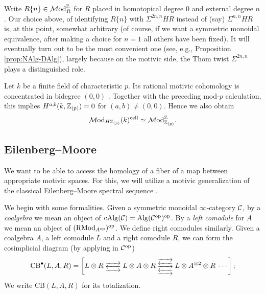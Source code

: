 \documentclass{amsart}
\numberwithin{proposition}{section}
\numberwithin{equation}{section}
\def\cell{\mathrm{cell}}
\newcommand{\CB}{\mathrm{CB}}
\begin{document}
\begin{remark}
Write $R\{n\} \in \mathcal{M}\mathrm{od}_R^{\mathbb{Z}}$ for $R$ placed in homotopical degree $0$ and external degree $n$.
Our choice above, of identifying $R\{n\}$ with $\Sigma^{2n,n}HR$ instead of (say) $\Sigma^{n,n}HR$ is, at this point, somewhat arbitrary (of course, if we want a symmetric monoidal equivalence, after making a choice for $n=1$ all others have been fixed).
It will eventually turn out to be the most convenient one (see, e.g., Proposition \ref{prop:NAlg-DAlg}), largely because on the motivic side, the Thom twist $\Sigma^{2n,n}$ plays a distinguished role.
\end{remark}

\begin{remark} \label{rmk:finite-field-motivic-cohomology}
Let $k$ be a finite field of characteristic $p$.
Its rational motivic cohomology is concentrated in bidegree $(0,0)$ \cite[Corollary~IV.1.13 and Example~VI.4.9]{weibel-k-book}.
Together with the preceding mod-$p$ calculation, this implies $H^{a,b}(k,\mathbb{Z}_{(p)})=0$ for $(a,b)\ne(0,0)$.
Hence we also obtain
\[
\Mod_{H\Z_{(p)}}(k)^\cell
\wequi \Mod_{\Z_{(p)}}^\Z.
\]
\end{remark}

\subsection{Eilenberg--Moore} \label{subsub:eilenberg-moore}
We want to be able to access the homology of a fiber of a map between appropriate motivic spaces.
For this, we will utilize a motivic generalization of the classical Eilenberg--Moore spectral sequence \cite{eilenberg-moore1962limits}.

We begin with some formalities.
Given a symmetric monoidal $\infty$-category $\mathcal C$, by a \emph{coalgebra} we mean an object of $\mathrm{cAlg}(\mathcal C) = \mathrm{Alg}(\mathcal C^{\mathrm{op}})^{\mathrm{op}}$.
By a \emph{left comodule} for $A$ we mean an object of $(\mathrm{RMod}_{A^{\mathrm{op}}})^{\mathrm{op}}$.
We define right comodules similarly.
Given a coalgebra $A$, a left comodule $L$ and a right comodule $R$, we can form the cosimplicial diagram (by applying \cite[Construction~4.4.2.7]{lurie-ha} in $\mathcal C^{\mathrm{op}}$)
\[
\CB^\bullet(L,A,R)
=
\left[
L\otimes R
\;\substack{
  \xrightarrow{\hspace*{1.5em}}\\[-0.7ex]
  \xleftarrow{\hspace*{1.5em}}\\[-0.7ex]
  \xrightarrow{\hspace*{1.5em}}
}\;
L\otimes A\otimes R
\;\substack{
  \xrightarrow{\hspace*{1.5em}}\\[-0.7ex]
  \xleftarrow{\hspace*{1.5em}}\\[-0.7ex]
  \xrightarrow{\hspace*{1.5em}}\\[-0.7ex]
  \xleftarrow{\hspace*{1.5em}}\\[-0.7ex]
  \xrightarrow{\hspace*{1.5em}}
}\;
L\otimes A^{\otimes 2}\otimes R
\;\cdots
\right];
\]
We write $\CB(L,A,R)$ for its totalization.
\end{document}
